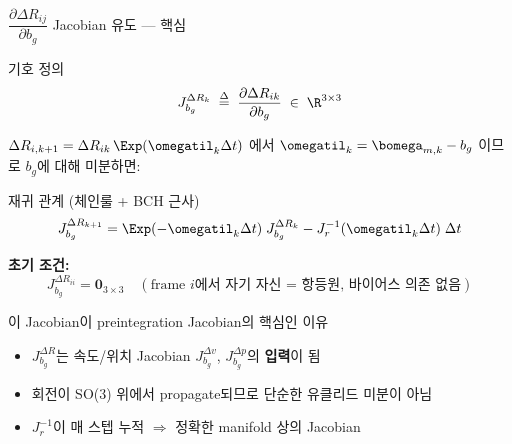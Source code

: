 \begin{frame}[shrink=10]{$\dfrac{\partial \Delta R_{ij}}{\partial b_g}$ Jacobian 유도 — 핵심}

  \begin{block}{기호 정의}
    \[
      J_{b_g}^{\Delta R_k} \;\stackrel{\Delta}{=}\; \frac{\partial \Delta R_{ik}}{\partial b_g}
      \;\in\; \R^{3\times 3}
    \]
  \end{block}

  \pause
  $\Delta R_{i,k+1} = \Delta R_{ik}\,\Exp(\omegatil_k\Delta t)$ 에서
  $\omegatil_k = \bomega_{m,k} - b_g$ 이므로 $b_g$에 대해 미분하면:

  \begin{block}{재귀 관계 (체인룰 + BCH 근사)}
    \[
      J_{b_g}^{\Delta R_{k+1}}
      = \Exp(-\omegatil_k\Delta t)\;J_{b_g}^{\Delta R_k}
        - J_r^{-1}(\omegatil_k\Delta t)\;\Delta t
    \]
  \end{block}

  \pause
  \textbf{초기 조건:}
  \[
    J_{b_g}^{\Delta R_{ii}} = \bm{0}_{3\times 3}
    \quad (\text{frame } i \text{에서 자기 자신 = 항등원, 바이어스 의존 없음})
  \]

  \pause
  \begin{alertblock}{이 Jacobian이 preintegration Jacobian의 핵심인 이유}
    \begin{itemize}
      \item $J_{b_g}^{\Delta R}$는 속도/위치 Jacobian $J_{b_g}^{\Delta v}$, $J_{b_g}^{\Delta p}$의 \textbf{입력}이 됨
      \item 회전이 SO(3) 위에서 propagate되므로 단순한 유클리드 미분이 아님
      \item $J_r^{-1}$이 매 스텝 누적 $\Rightarrow$ 정확한 manifold 상의 Jacobian
    \end{itemize}
  \end{alertblock}
\end{frame}


